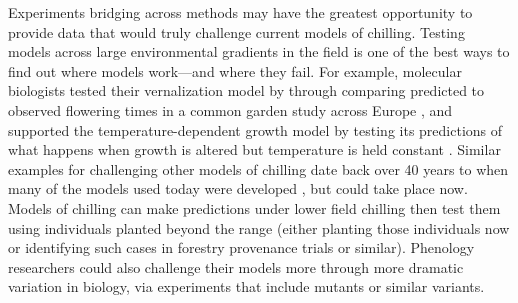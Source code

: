\documentclass[11pt]{article}
\begin{document}
Experiments bridging across methods may have the greatest opportunity to provide data that would truly challenge current models of chilling. Testing models across large environmental gradients in the field is one of the best ways to find out where models work---and where they fail. For example, molecular biologists tested their vernalization model by through comparing predicted to observed flowering times in a common garden study across Europe \citep[][]{Wilczek:2009oa}, and supported the temperature-dependent growth model by testing its predictions of what happens when growth is altered but temperature is held constant \citep{zhao2020temperature}. Similar examples for challenging other models of chilling date back over 40 years to when many of the models used today were developed \citep{richardson1974,chuine2016,ospreebbms}, but could take place now. Models of chilling can make predictions under lower field chilling then test them using individuals planted beyond the range (either planting those individuals now or identifying such cases in forestry provenance trials or similar). Phenology researchers could also challenge their models more through more dramatic variation in biology, via experiments that include mutants or similar variants. 
\end{document}
